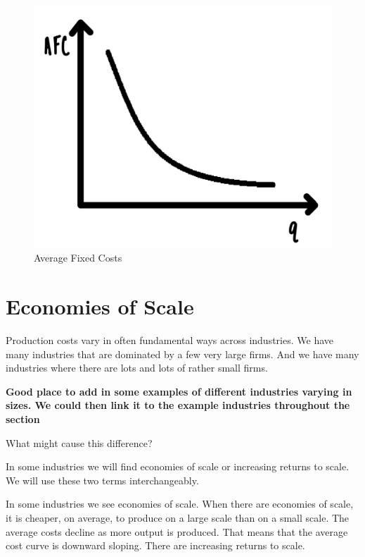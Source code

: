 \documentclass[
]{book}
\begin{document}
\begin{figure}

{\centering \includegraphics[width=0.75\linewidth]{img/supply/fig1} 

}

\caption{Average Fixed Costs}\label{fig:supply01}
\end{figure}

\hypertarget{economies-of-scale}{%
\section{Economies of Scale}\label{economies-of-scale}}

Production costs vary in often fundamental ways across industries. We have many industries that are dominated by a few very large firms. And we have many industries where there are lots and lots of rather small firms.

\begin{addition}
\textbf{Good place to add in some examples of different industries varying in sizes. We could then link it to the example industries throughout the section}

\end{addition}

What might cause this difference?

In some industries we will find economies of scale or increasing returns to scale. We will use these two terms interchangeably.

In some industries we see economies of scale. When there are economies of scale, it is cheaper, on average, to produce on a large scale than on a small scale. The average costs decline as more output is produced. That means that the average cost curve is downward sloping. There are increasing returns to scale.
\end{document}
